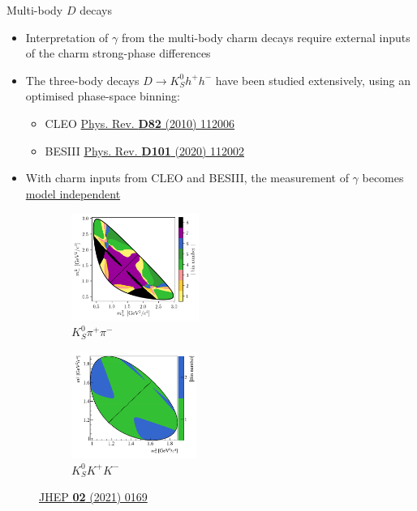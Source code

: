 \documentclass[xcolor={dvipsnames}]{beamer}
\begin{document}
\begin{frame}{Multi-body $D$ decays}
  \begin{itemize}
    \setlength\itemsep{0.5em}
    \item{Interpretation of $\gamma$ from the multi-body charm decays require external inputs of the charm strong-phase differences}
    \item{The three-body decays $D\to K_S^0h^+h^-$ have been studied extensively, using an optimised phase-space binning:}
    \begin{itemize}
      \item{CLEO \href{https://doi.org/10.1103/PhysRevD.82.112006}{Phys. Rev. \textbf{D82} (2010) 112006}}
      \item{BESIII \href{https://journals.aps.org/prd/abstract/10.1103/PhysRevD.101.112002}{Phys. Rev. \textbf{D101} (2020) 112002}}
    \end{itemize}
    \item{With charm inputs from CLEO and BESIII, the measurement of $\gamma$ becomes \underline{model independent}}
  \end{itemize}
  \begin{figure}
    \centering
    \begin{subfigure}{0.5\textwidth}
      \centering
      \includegraphics[height = 3.5cm]{Plots/KsPiPi_optimal.png}
      \vspace{-0.3cm}
      \caption*{$K_S^0\pi^+\pi^-$}
    \end{subfigure}%
    \begin{subfigure}{0.5\textwidth}
      \centering
      \includegraphics[height = 3.5cm]{Plots/KsKK_binning.png}
      \vspace{-0.3cm}
      \caption*{$K_S^0K^+K^-$}
    \end{subfigure}
    \vspace{-0.9cm}
    \caption*{\tiny\href{https://link.springer.com/article/10.1007/JHEP02(2021)169}{JHEP \textbf{02} (2021) 0169}}
  \end{figure}
\end{frame}
\end{document}
